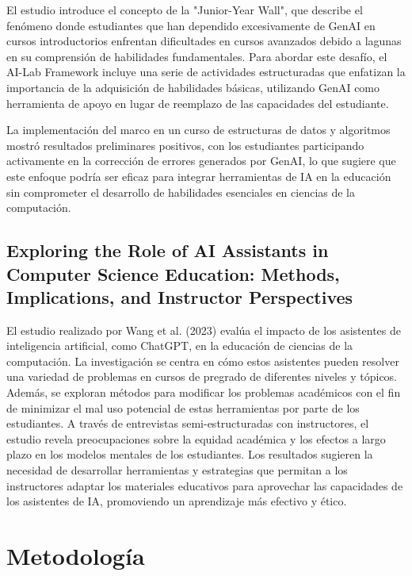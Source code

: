 \documentclass[a4paper,10pt]{article}
\begin{document}
El estudio introduce el concepto de la "Junior-Year Wall", que describe el fenómeno donde estudiantes que han dependido excesivamente de GenAI en cursos introductorios enfrentan dificultades en cursos avanzados debido a lagunas en su comprensión de habilidades fundamentales. Para abordar este desafío, el AI-Lab Framework incluye una serie de actividades estructuradas que enfatizan la importancia de la adquisición de habilidades básicas, utilizando GenAI como herramienta de apoyo en lugar de reemplazo de las capacidades del estudiante.

La implementación del marco en un curso de estructuras de datos y algoritmos mostró resultados preliminares positivos, con los estudiantes participando activamente en la corrección de errores generados por GenAI, lo que sugiere que este enfoque podría ser eficaz para integrar herramientas de IA en la educación sin comprometer el desarrollo de habilidades esenciales en ciencias de la computación.

\subsection*{Exploring the Role of AI Assistants in Computer Science Education: Methods, Implications, and Instructor Perspectives}

El estudio realizado por Wang et al. (2023) \cite{Wang2023ExploringTR} evalúa el impacto de los asistentes de inteligencia artificial, como ChatGPT, en la educación de ciencias de la computación. La investigación se centra en cómo estos asistentes pueden resolver una variedad de problemas en cursos de pregrado de diferentes niveles y tópicos. Además, se exploran métodos para modificar los problemas académicos con el fin de minimizar el mal uso potencial de estas herramientas por parte de los estudiantes. A través de entrevistas semi-estructuradas con instructores, el estudio revela preocupaciones sobre la equidad académica y los efectos a largo plazo en los modelos mentales de los estudiantes. Los resultados sugieren la necesidad de desarrollar herramientas y estrategias que permitan a los instructores adaptar los materiales educativos para aprovechar las capacidades de los asistentes de IA, promoviendo un aprendizaje más efectivo y ético.

\section{Metodología}
\end{document}
